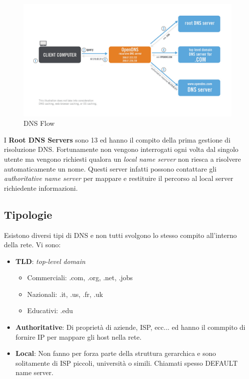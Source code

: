 \documentclass[12pt]{article}
\begin{document}
\begin{figure}[!hbpt]
  \includegraphics[width=\textwidth]{images/dnsflow.png}
  \caption{DNS Flow}
  \label{fig:dnsflow}
\end{figure}

I \textbf{Root DNS Servers} sono 13 ed hanno il compito della prima gestione di risoluzione DNS. Fortunamente non vengono interrogati ogni volta dal singolo utente ma vengono richiesti qualora un \textit{local name server} non riesca a risolvere automaticamente un nome. Questi server infatti possono contattare gli \textit{authoritative name server} per mappare e restituire il percorso al local server richiedente informazioni.

\subsection{Tipologie} %
Esistono diversi tipi di DNS e non tutti svolgono lo stesso compito all'interno della rete.
Vi sono:
\begin{itemize}
  \item \textbf{TLD}: \textit{top-level domain}
  \begin{itemize}
    \item Commerciali: .com, .org, .net, .jobs
    \item Nazionali: .it, .us, .fr, .uk
    \item Educativi: .edu
  \end{itemize}
  \item \textbf{Authoritative}: Di proprietà di aziende, ISP, ecc... ed hanno il commpito di fornire IP per mappare gli host nella rete.
  \item \textbf{Local}: Non fanno per forza parte della struttura gerarchica e sono solitamente di ISP piccoli, università o simili. Chiamati spesso DEFAULT name server.
\end{itemize}
\end{document}
